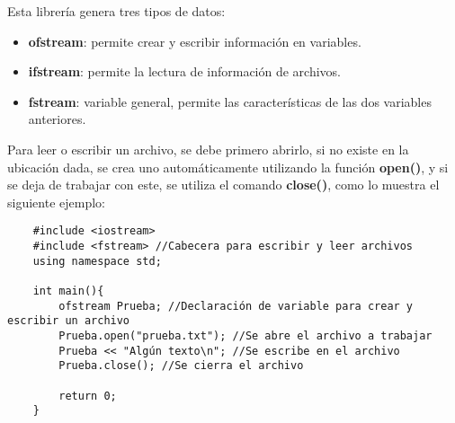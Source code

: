 Esta librería genera tres tipos de datos:
\begin{itemize}
    \item \textbf{ofstream}: permite crear y escribir información en variables.
    \item \textbf{ifstream}: permite la lectura de información de archivos.
    \item \textbf{fstream}: variable general, permite las características de las dos variables anteriores.
\end{itemize}

Para leer o escribir un archivo, se debe primero abrirlo, si no existe en la ubicación dada, se crea uno automáticamente utilizando la función \textbf{open()}, y si se deja de trabajar con este, se utiliza el comando \textbf{close()}, como lo muestra el siguiente ejemplo:
\begin{lstlisting}
    #include <iostream>
    #include <fstream> //Cabecera para escribir y leer archivos
    using namespace std;
    
    int main(){
        ofstream Prueba; //Declaración de variable para crear y escribir un archivo
        Prueba.open("prueba.txt"); //Se abre el archivo a trabajar
        Prueba << "Algún texto\n"; //Se escribe en el archivo
        Prueba.close(); //Se cierra el archivo
        
        return 0;
    }
\end{lstlisting}

